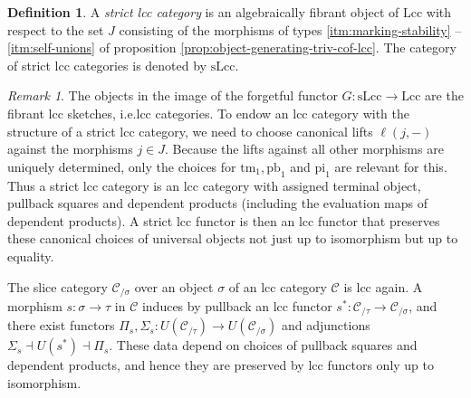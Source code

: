 \documentclass[a4paper]{article}
\theoremstyle{remark}
\newtheorem{remark}[theorem]{Remark}
\theoremstyle{definition}
\newtheorem{definition}[theorem]{Definition}
\begin{document}
\begin{definition}
  A \emph{strict lcc category} is an algebraically fibrant object of $\mathrm{Lcc}$ with respect to the set $J$ consisting of the morphisms of types \ref{itm:marking-stability} -- \ref{itm:self-unions} of proposition \ref{prop:object-generating-triv-cof-lcc}.
  The category of strict lcc categories is denoted by $\mathrm{sLcc}$.
\end{definition}

\begin{remark}
  The objects in the image of the forgetful functor $G : \mathrm{sLcc} \rightarrow \mathrm{Lcc}$ are the fibrant lcc sketches, i.e.\@ lcc categories.
  To endow an lcc category with the structure of a strict lcc category, we need to choose canonical lifts $\ell(j, -)$ against the morphisms $j \in J$.
  Because the lifts against all other morphisms are uniquely determined, only the choices for $\mathrm{tm}_1, \mathrm{pb}_1$ and $\mathrm{pi}_1$ are relevant for this.
  Thus a strict lcc category is an lcc category with assigned terminal object, pullback squares and dependent products (including the evaluation maps of dependent products).
  A strict lcc functor is then an lcc functor that preserves these canonical choices of universal objects not just up to isomorphism but up to equality.
\end{remark}

The slice category $\mathcal{C}_{/ \sigma}$ over an object $\sigma$ of an lcc category $\mathcal{C}$ is lcc again.
A morphism $s : \sigma \rightarrow \tau$ in $\mathcal{C}$ induces by pullback an lcc functor $s^* : \mathcal{C}_{/ \tau} \rightarrow \mathcal{C}_{/ \sigma}$, and there exist functors $\Pi_s, \Sigma_s : U(\mathcal{C}_{/ \tau}) \rightarrow U(\mathcal{C}_{/ \sigma})$ and adjunctions $\Sigma_s \dashv U(s^*) \dashv \Pi_s$.
These data depend on choices of pullback squares and dependent products, and hence they are preserved by lcc functors only up to isomorphism.
\end{document}
